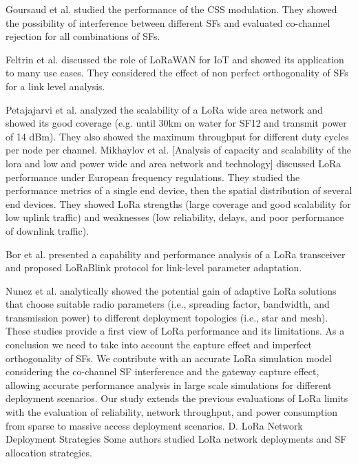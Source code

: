 Goursaud et al.
\cite{goursaud_dedicated_2015} studied the performance of the CSS modulation.
They showed the possibility of interference between different SFs and evaluated co-channel rejection for all combinations of SFs.

Feltrin et al.
\cite{feltrin_lorawan_2018} discussed the role of LoRaWAN for IoT and showed its application to many use cases.
They considered the effect of non perfect orthogonality of SFs for a link level analysis.

Petajajarvi et al.
\cite{petajajarvi_performance_2017} analyzed the scalability of a LoRa wide area network and showed its good coverage (e.g.
until 30km on water for SF12 and transmit power of 14 dBm).
They also showed the maximum throughput for different duty cycles per node per channel.
Mikhaylov et al.
[Analysis of capacity and scalability of the lora and low and power wide and area network and technology] discussed LoRa performance under European frequency regulations.
They studied the performance metrics of a single end device,
	then the spatial distribution of several end devices.
They showed LoRa strengths (large coverage and good scalability for low uplink traffic) and weaknesses (low reliability,
	delays,
	and poor performance of downlink traffic).

Bor et al.
\cite{bor_lora_nodate} presented a capability and performance analysis of a LoRa transceiver and proposed LoRaBlink protocol for link-level parameter adaptation.

Nunez et al.
\cite{ochoa_evaluating_2017} analytically showed the potential gain of adaptive LoRa solutions that choose suitable radio parameters (i.e.,
	spreading factor,
	bandwidth,
	and transmission power) to different deployment topologies (i.e.,
	star and mesh).
These studies provide a first view of LoRa performance and its limitations.
As a conclusion we need to take into account the capture effect and imperfect orthogonality of SFs.
We contribute with an accurate LoRa simulation model considering the co-channel SF interference and the gateway capture effect,
	allowing accurate performance analysis in large scale simulations for different deployment scenarios.
Our study extends the previous evaluations of LoRa limits with the evaluation of reliability,
	network throughput,
	and power consumption from sparse to massive access deployment scenarios.
D.
LoRa Network Deployment Strategies Some authors studied LoRa network deployments and SF allocation strategies.

